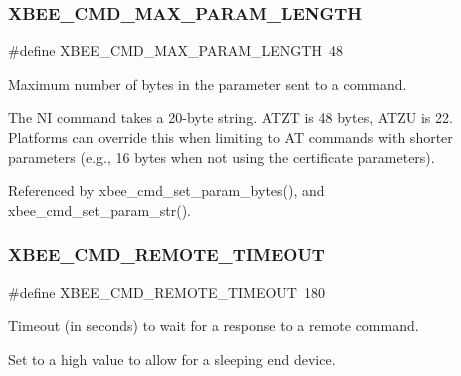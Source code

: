 \subsubsection{\texorpdfstring{X\+B\+E\+E\+\_\+\+C\+M\+D\+\_\+\+M\+A\+X\+\_\+\+P\+A\+R\+A\+M\+\_\+\+L\+E\+N\+G\+TH}{XBEE\_CMD\_MAX\_PARAM\_LENGTH}}
{\footnotesize\ttfamily \#define X\+B\+E\+E\+\_\+\+C\+M\+D\+\_\+\+M\+A\+X\+\_\+\+P\+A\+R\+A\+M\+\_\+\+L\+E\+N\+G\+TH~48}



Maximum number of bytes in the parameter sent to a command. 

The NI command takes a 20-\/byte string. A\+T\+ZT is 48 bytes, A\+T\+ZU is 22. Platforms can override this when limiting to AT commands with shorter parameters (e.\+g., 16 bytes when not using the certificate parameters). 

Referenced by xbee\+\_\+cmd\+\_\+set\+\_\+param\+\_\+bytes(), and xbee\+\_\+cmd\+\_\+set\+\_\+param\+\_\+str().

\mbox{\label{group__xbee__atcmd_ga386fdd4cf7046c98379878dab89e5012}} 
\subsubsection{\texorpdfstring{X\+B\+E\+E\+\_\+\+C\+M\+D\+\_\+\+R\+E\+M\+O\+T\+E\+\_\+\+T\+I\+M\+E\+O\+UT}{XBEE\_CMD\_REMOTE\_TIMEOUT}}
{\footnotesize\ttfamily \#define X\+B\+E\+E\+\_\+\+C\+M\+D\+\_\+\+R\+E\+M\+O\+T\+E\+\_\+\+T\+I\+M\+E\+O\+UT~180}



Timeout (in seconds) to wait for a response to a remote command. 

Set to a high value to allow for a sleeping end device. \mbox{\label{group__xbee__atcmd_gac86e9f2dc459c0c6b758ba90142bbc54}} 
